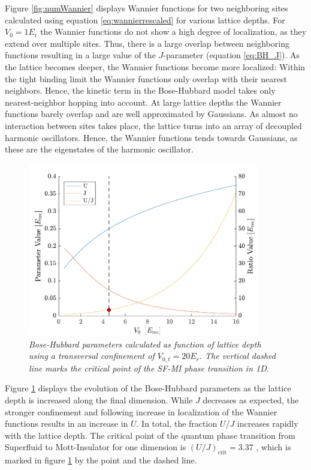 Figure \ref{fig:numWannier} displays Wannier functions for two neighboring sites calculated using equation \ref{eq:wannierrescaled} for various lattice depths. For $V_0 = 1 E_{\mathrm{r}}$ the Wannier functions do not show a high degree of localization, as they extend over multiple sites. Thus, there is a large overlap between neighboring functions resulting in a large value of the $J$-parameter (equation \ref{eq:BH_J}). As the lattice becomes deeper, the Wannier functions become more localized: Within the tight binding limit the Wannier functions only overlap with their nearest neighbors. Hence, the kinetic term in the Bose-Hubbard model takes only nearest-neighbor hopping into account. At large lattice depths the Wannier functions barely overlap and are well approximated by Gaussians. As almost no interaction between sites takes place, the lattice turns into an array of decoupled harmonic oscillators. Hence, the Wannier functions tends towards Gaussians, as these are the eigenstates of the harmonic oscillator. 
\begin{figure}[h]
	\centering
	\includegraphics[width=0.9\textwidth]{Figures/parameters.pdf}
	\caption{\textit{Bose-Hubbard parameters calculated as function of lattice depth using a transversal confinement of $V_{0,t} = 20 E_r$. The vertical dashed line marks the critical point of the SF-MI phase transition in 1D. }}
	\label{fig:params}
\end{figure}
Figure \ref{fig:params} displays the evolution of the Bose-Hubbard parameters as the lattice depth is increased along the final dimension. While $J$ decreases as expected, the stronger confinement and following increase in localization of the Wannier functions results in an increase in $U$. In total, the fraction $U/J$ increases rapidly with the lattice depth. The critical point of the quantum phase transition from Superfluid to Mott-Insulator for one dimension is $\left( U/J \right)_{\mathrm{crit}} = 3.37$ \cite{Kuhner2000}, which is marked in figure \ref{fig:params} by the point and the dashed line. 